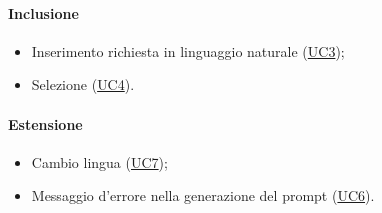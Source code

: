 \paragraph*{Inclusione}
\begin{itemize}
  \item Inserimento richiesta in linguaggio naturale (\hyperref[UC3]{UC3});
  \item Selezione  (\hyperref[UC4]{UC4}).
\end{itemize}

\paragraph*{Estensione}
\begin{itemize}
  \item Cambio lingua (\hyperref[UC7]{UC7});
  \item Messaggio d'errore nella generazione del prompt (\hyperref[UC6]{UC6}).
\end{itemize}
